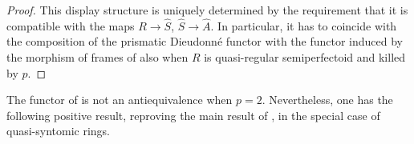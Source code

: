 \documentclass{amsart}
\theoremstyle{plain}
\theoremstyle{definition}
\begin{document}
\begin{proof}
This display structure is uniquely determined by the requirement that it is compatible with the maps $R \to \hat{S}$, $\hat{S} \to \hat{A}$. In particular, it has to coincide with the composition of the prismatic Dieudonn\'e functor with the functor induced by the morphism of frames of  also when $R$ is quasi-regular semiperfectoid and killed by $p$.        
\end{proof}

The functor of  is not an antiequivalence when $p=2$. Nevertheless, one has the following positive result, reproving the main result of \cite{zink_the_display_of_a_formal_p_divisible_group}, \cite{lau_displays_and_formal_p_divisible_groups} in the special case of quasi-syntomic rings.
\end{document}
